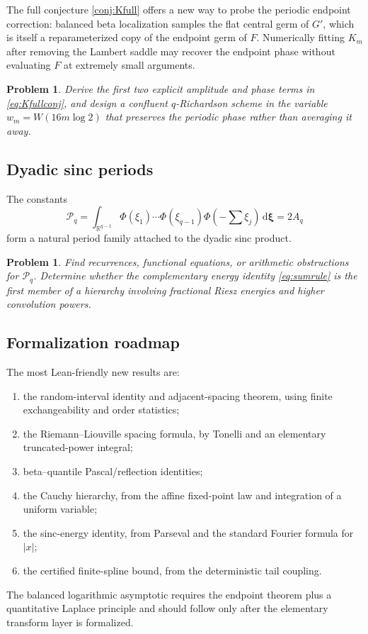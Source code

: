 \documentclass[11pt,oneside]{article}
\newtheorem{problem}[theorem]{Problem}
\theoremstyle{definition}
\theoremstyle{remark}
\newcommand{\F}{F}
\newcommand{\G}{G}
\newcommand{\R}{\mathbb R}
\newcommand{\dd}{\,\mathrm d}
\begin{document}
The full conjecture \cref{conj:Kfull} offers a new way to probe the periodic
endpoint correction: balanced beta localization samples the flat central germ
of \(\G'\), which is itself a reparameterized copy of the endpoint germ of
\(\F\).  Numerically fitting \(K_m\) after removing the Lambert saddle may
recover the endpoint phase without evaluating \(\F\) at extremely small
arguments.

\begin{problem}
Derive the first two explicit amplitude and phase terms in
\eqref{eq:Kfullconj}, and design a confluent \(q\)-Richardson scheme in the
variable \(w_m=W(16m\log2)\) that preserves the periodic phase rather than
averaging it away.
\end{problem}

\subsection{Dyadic sinc periods}

The constants
\begin{equation}
 \mathcal P_q=\int_{\R^{q-1}}
 \Phi(\xi_1)\cdots\Phi(\xi_{q-1})
 \Phi\!\left(-\sum\xi_j\right)\dd\bm\xi=2A_q
\end{equation}
form a natural period family attached to the dyadic sinc product.

\begin{problem}
Find recurrences, functional equations, or arithmetic obstructions for
\(\mathcal P_q\).  Determine whether the complementary energy identity
\eqref{eq:sumrule} is the first member of a hierarchy involving fractional
Riesz energies and higher convolution powers.
\end{problem}

\subsection{Formalization roadmap}

The most Lean-friendly new results are:
\begin{enumerate}
 \item the random-interval identity and adjacent-spacing theorem, using finite
       exchangeability and order statistics;
 \item the Riemann--Liouville spacing formula, by Tonelli and an elementary
       truncated-power integral;
 \item beta--quantile Pascal/reflection identities;
 \item the Cauchy hierarchy, from the affine fixed-point law and integration of
       a uniform variable;
 \item the sinc-energy identity, from Parseval and the standard Fourier formula
       for \(|x|\);
 \item the certified finite-spline bound, from the deterministic tail coupling.
\end{enumerate}
The balanced logarithmic asymptotic requires the endpoint theorem plus a
quantitative Laplace principle and should follow only after the elementary
transform layer is formalized.
\end{document}
